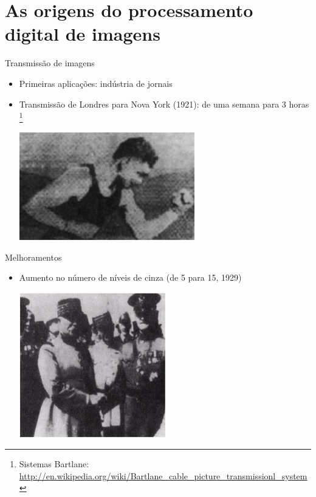    \section[ slide = true]{As origens do processamento digital de imagens}
      \begin{slide}[toc=]{Transmissão de imagens}
         \begin{itemize}
            \item Primeiras aplicações: indústria de jornais
            \item Transmissão de Londres para Nova York (1921): de uma semana para 3 horas
	    \footnote{\tiny{Sistemas Bartlane: \url{http://en.wikipedia.org/wiki/Bartlane_cable_picture_transmissionl_system}}}\\
            \begin{center}\includegraphics[width=0.6\textwidth]{figs/bartlane_1921}\end{center}
         \end{itemize}         
      \end{slide}

      \begin{slide}[toc=]{Melhoramentos}
         \begin{itemize}
            \item Aumento no número de níveis de cinza (de 5 para 15, 1929)
            \begin{center}\includegraphics[width=0.5\textwidth]{figs/pershing_foch_1929}\end{center}
         \end{itemize}         
      \end{slide}

